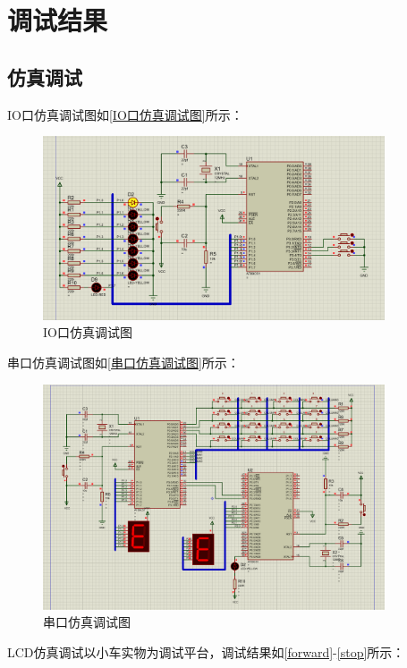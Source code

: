 \section{调试结果}
\subsection{仿真调试}
IO口仿真调试图如\autoref{IO口仿真调试图}所示：
\begin{figure}[!htbp]
    \centering
    \includegraphics[width =0.9\textwidth]{figures/io口仿真.png}
    \caption{IO口仿真调试图}
    \label{IO口仿真调试图}
\end{figure}
\newline
串口仿真调试图如\autoref{串口仿真调试图}所示：
\begin{figure}[!htbp]
    \centering
    \includegraphics[width =0.9\textwidth]{figures/串口仿真.png}
    \caption{串口仿真调试图}
    \label{串口仿真调试图}
\end{figure}
\newline
LCD仿真调试以小车实物为调试平台，调试结果如\autoref{forward}-\autoref{stop}所示：

